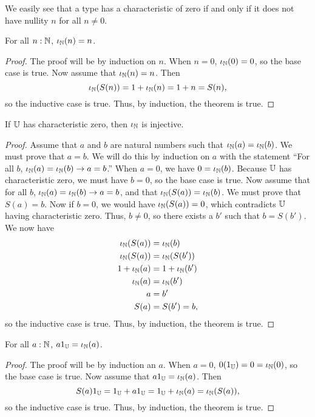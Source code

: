 \documentclass[../math.tex]{subfiles}
\begin{document}
We easily see that a type has a characteristic of zero if and only if it does
not have nullity $n$ for all $n \neq 0$.

\begin{theorem}
    For all $n : \mathbb{N}$, $\iota_{\mathbb{N}}(n) = n$.
\end{theorem}
\begin{proof}
    The proof will be by induction on $n$.  When $n = 0$, $\iota_{\mathbb{N}}(0) = 0$, so
    the base case is true.  Now assume that $\iota_{\mathbb{N}}(n) = n$.  Then
    \[
        \iota_{\mathbb{N}}(S(n)) = 1 + \iota_{\mathbb{N}}(n) = 1 + n = S(n),
    \]
    so the inductive case is true.  Thus, by induction, the theorem is true.
\end{proof}

\begin{instance}
    If $\mathbb{U}$ has characteristic zero, then $\iota_{\mathbb{N}}$ is injective.
\end{instance}
\begin{proof}
    Assume that $a$ and $b$ are natural numbers such that $\iota_{\mathbb{N}}(a) =
    \iota_{\mathbb{N}}(b)$.  We must prove that $a = b$.  We will do this by induction on
    $a$ with the statement ``For all $b$, $\iota_{\mathbb{N}}(a) = \iota_{\mathbb{N}}(b) \rightarrow
    a = b$.''  When $a = 0$, we have $0 = \iota_{\mathbb{N}}(b)$.  Because $\mathbb{U}$ has
    characteristic zero, we must have $b = 0$, so the base case is true.  Now
    assume that for all $b$, $\iota_{\mathbb{N}}(a) = \iota_{\mathbb{N}}(b) \rightarrow a = b$, and
    that $\iota_{\mathbb{N}}(S(a)) = \iota_{\mathbb{N}}(b)$.  We must prove that $S(a) = b$.  Now if
    $b = 0$, we would have $\iota_{\mathbb{N}}(S(a)) = 0$, which contradicts $\mathbb{U}$ having
    characteristic zero.  Thus, $b \neq 0$, so there exists a $b'$ such that $b
    = S(b')$.  We now have
    \begin{align*}
        \iota_{\mathbb{N}}(S(a)) &= \iota_{\mathbb{N}}(b) \\
        \iota_{\mathbb{N}}(S(a)) &= \iota_{\mathbb{N}}(S(b')) \\
        1 + \iota_{\mathbb{N}}(a) &= 1 + \iota_{\mathbb{N}}(b') \\
        \iota_{\mathbb{N}}(a) &= \iota_{\mathbb{N}}(b') \\
        a &= b' \\
        S(a) &= S(b') = b,
    \end{align*}
    so the inductive case is true.  Thus, by induction, the theorem is true.
\end{proof}

\begin{theorem}
    For all $a : \mathbb{N}$, $a1_{\mathbb{U}} = \iota_{\mathbb{N}}(a)$.
\end{theorem}
\begin{proof}
    The proof will be by induction an $a$.  When $a = 0$, $0(1_{\mathbb{U}}) = 0 =
    \iota_{\mathbb{N}}(0)$, so the base case is true.  Now assume that $a1_{\mathbb{U}} = \iota_{\mathbb{N}}(a)$.  Then
    \[
        S(a)1_{\mathbb{U}} = 1_{\mathbb{U}} + a1_{\mathbb{U}} = 1_{\mathbb{U}} + \iota_{\mathbb{N}}(a) = \iota_{\mathbb{N}}(S(a)),
    \]
    so the inductive case is true.  Thus, by induction, the theorem is true.
\end{proof}
\end{document}
